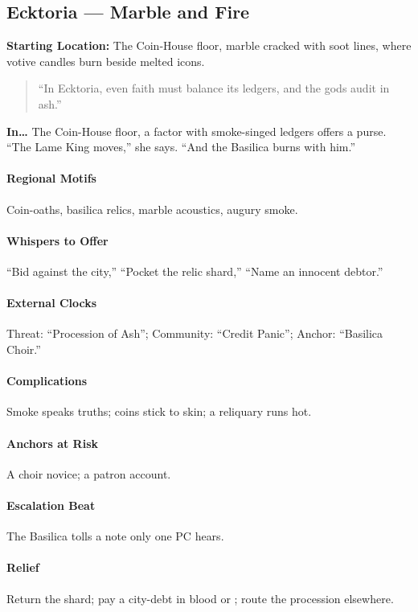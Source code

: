 \subsection*{Ecktoria — Marble and Fire}
\textbf{Starting Location:} The Coin‑House floor, marble cracked with soot lines, where votive candles burn beside melted icons.
\begin{quote}
“In Ecktoria, even faith must balance its ledgers, and the gods audit in ash.”
\end{quote}

\textbf{In…} The Coin-House floor, a factor with smoke-singed ledgers offers a purse. ``The Lame King moves,'' she says. ``And the Basilica burns with him.''
\paragraph{Regional Motifs} Coin-oaths, basilica relics, marble acoustics, augury smoke.
\paragraph{Whispers to Offer} ``Bid against the city,'' ``Pocket the relic shard,'' ``Name an innocent debtor.''
\paragraph{External Clocks} Threat: ``Procession of Ash''; Community: ``Credit Panic''; Anchor: ``Basilica Choir.''
\paragraph{Complications} Smoke speaks truths; coins stick to skin; a reliquary runs hot.
\paragraph{Anchors at Risk} A choir novice; a patron account.
\paragraph{Escalation Beat} The Basilica tolls a note only one PC hears.
\paragraph{Relief} Return the shard; pay a city-debt in blood or \Boons{}; route the procession elsewhere.

